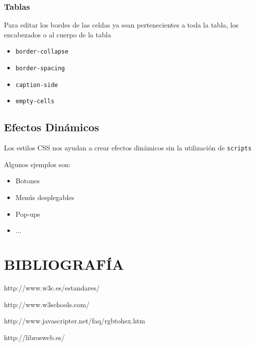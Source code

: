 \documentclass{beamer}
\begin{document}
\begin{frame}[fragile] %
\frametitle{Tablas}
	Para editar los bordes de las celdas ya sean pertenecientes a toda la tabla, los encabezados o al cuerpo de la tabla
	\pause
	\begin{itemize}[<+->]
	\item \verb|border-collapse|
	\item \verb|border-spacing|
	\item \verb|caption-side|
	\item \verb|empty-cells|
	\end{itemize}
\end{frame}
	\subsection{Efectos Dinámicos}
\begin{frame}[fragile] %
	Los estilos CSS nos ayudan a crear efectos dinámicos sin la utilización de \verb|scripts|
	
	Algunos ejemplos son:
	\begin{itemize}[<+->]
	\item Botones
	\item Menús desplegables
	\item Pop-ups
	\item ...
	\end{itemize}
\end{frame}
	
\section{BIBLIOGRAFÍA}
\begin{frame}
	http://www.w3c.es/estandares/
	
	http://www.w3schools.com/
	
	http://www.javascripter.net/faq/rgbtohex.htm
	
	http://librosweb.es/
\end{frame}
\end{document}
